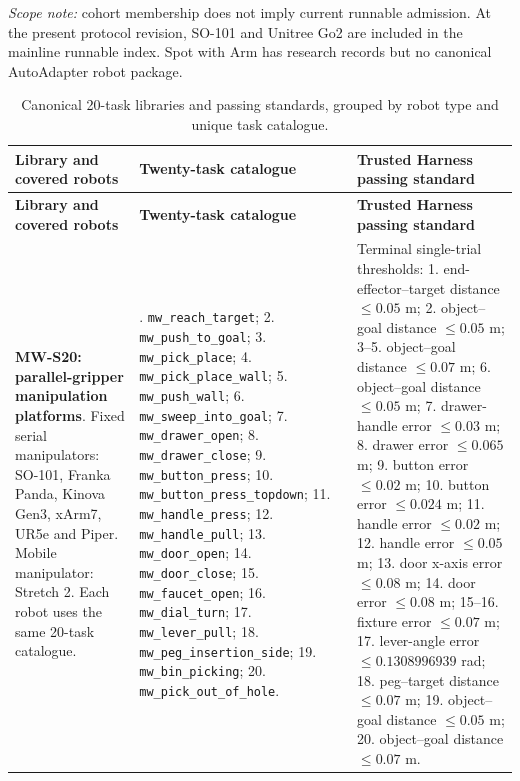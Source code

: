 \noindent\emph{Scope note:} cohort membership does not imply current runnable admission. At the present protocol revision, SO-101 and Unitree Go2 are included in the mainline runnable index. Spot with Arm has research records but no canonical AutoAdapter robot package.
\endgroup

\clearpage


\clearpage
\begin{landscape}
\begingroup
\scriptsize
{}
\renewcommand{\arraystretch}{1.12}
\begin{longtable}{@{}>{\raggedright\arraybackslash}p{47mm}>{\raggedright\arraybackslash}p{85mm}>{\raggedright\arraybackslash}p{84mm}@{}}
\caption{Canonical 20-task libraries and passing standards, grouped by robot type and unique task catalogue.}
\label{tab:appendix-task-libraries}\\
\toprule
\textbf{Library and covered robots} & \textbf{Twenty-task catalogue} & \textbf{Trusted Harness passing standard} \\
\midrule
\endfirsthead
\toprule
\textbf{Library and covered robots} & \textbf{Twenty-task catalogue} & \textbf{Trusted Harness passing standard} \\
\midrule
\endhead
\endfoot
\bottomrule
\endlastfoot
\textbf{MW-S20: parallel-gripper manipulation platforms}. Fixed serial manipulators: SO-101, Franka Panda, Kinova Gen3, xArm7, UR5e and Piper. Mobile manipulator: Stretch 2. Each robot uses the same 20-task catalogue. &
1. \texttt{mw\_reach\_target}; 2. \texttt{mw\_push\_to\_goal}; 3. \texttt{mw\_pick\_place}; 4. \texttt{mw\_pick\_place\_wall}; 5. \texttt{mw\_push\_wall}; 6. \texttt{mw\_sweep\_into\_goal}; 7. \texttt{mw\_drawer\_open}; 8. \texttt{mw\_drawer\_close}; 9. \texttt{mw\_button\_press}; 10. \texttt{mw\_button\_press\_topdown}; 11. \texttt{mw\_handle\_press}; 12. \texttt{mw\_handle\_pull}; 13. \texttt{mw\_door\_open}; 14. \texttt{mw\_door\_close}; 15. \texttt{mw\_faucet\_open}; 16. \texttt{mw\_dial\_turn}; 17. \texttt{mw\_lever\_pull}; 18. \texttt{mw\_peg\_insertion\_side}; 19. \texttt{mw\_bin\_picking}; 20. \texttt{mw\_pick\_out\_of\_hole}. &
Terminal single-trial thresholds: 1. end-effector--target distance $\leq 0.05$ m; 2. object--goal distance $\leq 0.05$ m; 3--5. object--goal distance $\leq 0.07$ m; 6. object--goal distance $\leq 0.05$ m; 7. drawer-handle error $\leq 0.03$ m; 8. drawer error $\leq 0.065$ m; 9. button error $\leq 0.02$ m; 10. button error $\leq 0.024$ m; 11. handle error $\leq 0.02$ m; 12. handle error $\leq 0.05$ m; 13. door x-axis error $\leq 0.08$ m; 14. door error $\leq 0.08$ m; 15--16. fixture error $\leq 0.07$ m; 17. lever-angle error $\leq 0.1308996939$ rad; 18. peg--target distance $\leq 0.07$ m; 19. object--goal distance $\leq 0.05$ m; 20. object--goal distance $\leq 0.07$ m. \\

\end{longtable}
\end{landscape}
